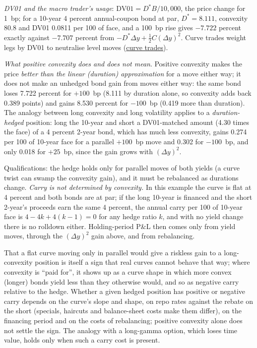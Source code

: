\begin{qfmodel}
\emph{DV01 and the macro trader's usage}: $\mathrm{DV01}=D^*B/10{,}000$, the price change for 1~bp; for a 10-year 4 percent annual-coupon bond at par, $D^*=8.111$, convexity 80.8 and DV01 0.0811 per 100 of face, and a 100~bp rise gives $-7.722$ percent exactly against $-7.707$ percent from $-D^*\Delta y+\tfrac12C(\Delta y)^2$. Curve trades weight legs by DV01 to neutralise level moves (\hyperref[meth:curve-trades-carry-rolldown]{curve trades}).

\emph{What positive convexity does and does not mean}. Positive convexity makes the price \emph{better than the linear (duration) approximation} for a move either way; it does not make an unhedged bond gain from moves either way: the same bond loses 7.722 percent for $+100$~bp (8.111 by duration alone, so convexity adds back 0.389 points) and gains 8.530 percent for $-100$~bp (0.419 more than duration). The analogy between long convexity and long volatility applies to a \emph{duration-hedged} position: long the 10-year and short a DV01-matched amount (4.30 times the face) of a 4 percent 2-year bond, which has much less convexity, gains 0.274 per 100 of 10-year face for a parallel $+100$~bp move and 0.302 for $-100$~bp, and only 0.018 for $+25$~bp, since the gain grows with $(\Delta y)^2$.

Qualifications: the hedge holds only for parallel moves of both yields (a curve twist can swamp the convexity gain), and it must be rebalanced as durations change. \emph{Carry is not determined by convexity.} In this example the curve is flat at 4 percent and both bonds are at par; if the long 10-year is financed and the short 2-year's proceeds earn the same 4 percent, the annual carry per 100 of 10-year face is $4-4k+4(k-1)=0$ for any hedge ratio $k$, and with no yield change there is no rolldown either. Holding-period P\&L then comes only from yield moves, through the $(\Delta y)^2$ gain above, and from rebalancing.

That a flat curve moving only in parallel would give a riskless gain to a long-convexity position is itself a sign that real curves cannot behave that way; where convexity is ``paid for'', it shows up as a curve shape in which more convex (longer) bonds yield less than they otherwise would, and so as negative carry relative to the hedge. Whether a given hedged position has positive or negative carry depends on the curve's slope and shape, on repo rates against the rebate on the short (specials, haircuts and balance-sheet costs make them differ), on the financing period and on the costs of rebalancing; positive convexity alone does not settle the sign. The analogy with a long-gamma option, which loses time value, holds only when such a carry cost is present.


\end{qfmodel}
